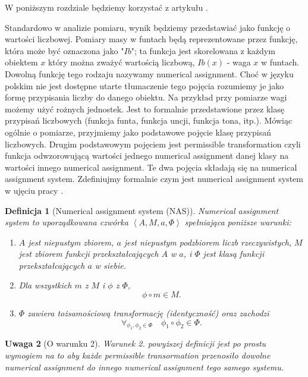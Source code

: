 \documentclass[12pt,a4paper]{report}
\newtheorem{definition}{Definicja}[chapter]
\newtheorem{remark}[definition]{Uwaga}
\newcommand{\tuple}[1]{\left\langle {#1} \right\rangle}
\begin{document}
W poniższym rozdziale będziemy korzystać z artykułu {\citep{adams1965theory}}.

Standardowo w analizie pomiaru, wynik będziemy przedstawiać jako funkcję o wartości liczbowej. Pomiary masy w funtach będą reprezentowane przez funkcję, która może być oznaczona jako "$Ib$";  ta funkcja jest skorelowana z każdym obiektem $x$ który można zważyć wartością liczbową, $Ib(x)$ - waga $x$ w funtach. Dowolną funkcję tego rodzaju nazywamy numerical assignment. Choć w języku polskim nie jest dostępne utarte tłumaczenie tego pojęcia rozumiemy je jako formę przypisania liczby do danego obiektu. Na przykład przy pomiarze wagi możemy użyć rożnych jednostek. Jest to formalnie przedstawione  przez klasę przypisań liczbowych (funkcja funta, funkcja uncji, funkcja tona, itp.). Mówiąc ogólnie o pomiarze, przyjmiemy jako podstawowe pojęcie klasę przypisań liczbowych. Drugim podstawowym pojęciem jest permissible transformation czyli funkcja odwzorowującą wartości jednego numerical assignment danej klasy na wartości innego numerical assignment. Te dwa pojęcia składają się na numerical assignment system. Zdefiniujmy formalnie czym jest numerical assignment system w ujęciu pracy {\citep{adams1965theory}}.
\begin{definition}[Numerical assignment system (NAS){\citep[Def. 1]{adams1965theory}}] 
Numerical assignment system to uporządkowana czwórka $\tuple{A, M, a, \Phi}$ spełniająca poniższe warunki:
\begin{enumerate}
\item
$A$ jest niepustym zbiorem, $a$ jest niepustym podzbiorem liczb rzeczywistych, $M$ jest zbiorem funkcji przekształcających $A$ w $a$, i $\Phi$ jest klasą funkcji przekształcających $a$ w siebie.  
\item
Dla wszystkich $m$ z $M$ i $\phi$ z $\Phi$,
$$
 \phi \circ m \in M.
$$ 
\item
$\Phi$ zawiera tożsamościową transformację (identyczność) oraz zachodzi
$$
\forall_{\phi_{1}, \phi_{2} \in \Phi} \quad \phi_{1} \circ \phi_{2} \in \Phi.
$$

\end{enumerate}

\end{definition}

\begin{remark}[O warunku 2]
Warunek 2. powyższej definicji jest po prostu wymogiem na to aby każde permissible transormation przenosiło dowolne numerical assignment do innego numerical assignment tego samego systemu.
\end{remark}
\end{document}
